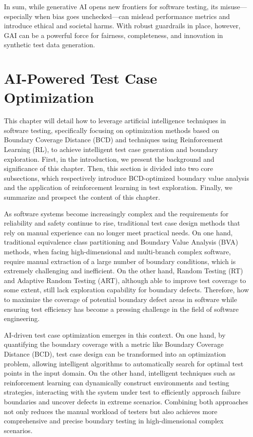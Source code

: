 \documentclass[manuscript,screen,review]{acmart}
\begin{document}
In sum, while generative AI opens new frontiers for software testing, its misuse---especially when bias goes unchecked---can mislead performance metrics and introduce ethical and societal harms. With robust guardrails in place, however, GAI can be a powerful force for fairness, completeness, and innovation in synthetic test data generation.




\section{AI-Powered Test Case Optimization}
\label{sec:3}

This chapter will detail how to leverage artificial intelligence techniques in software testing, specifically focusing on optimization methods based on Boundary Coverage Distance (BCD) and techniques using Reinforcement Learning (RL), to achieve intelligent test case generation and boundary exploration. First, in the introduction, we present the background and significance of this chapter. Then, this section is divided into two core subsections, which respectively introduce BCD-optimized boundary value analysis and the application of reinforcement learning in test exploration. Finally, we summarize and prospect the content of this chapter.

As software systems become increasingly complex and the requirements for reliability and safety continue to rise, traditional test case design methods that rely on manual experience can no longer meet practical needs. On one hand, traditional equivalence class partitioning and Boundary Value Analysis (BVA) methods, when facing high-dimensional and multi-branch complex software, require manual extraction of a large number of boundary conditions, which is extremely challenging and inefficient. On the other hand, Random Testing (RT) and Adaptive Random Testing (ART), although able to improve test coverage to some extent, still lack exploration capability for boundary defects. Therefore, how to maximize the coverage of potential boundary defect areas in software while ensuring test efficiency has become a pressing challenge in the field of software engineering.

AI-driven test case optimization emerges in this context. On one hand, by quantifying the boundary coverage with a metric like Boundary Coverage Distance (BCD), test case design can be transformed into an optimization problem, allowing intelligent algorithms to automatically search for optimal test points in the input domain. On the other hand, intelligent techniques such as reinforcement learning can dynamically construct environments and testing strategies, interacting with the system under test to efficiently approach failure boundaries and uncover defects in extreme scenarios. Combining both approaches not only reduces the manual workload of testers but also achieves more comprehensive and precise boundary testing in high-dimensional complex scenarios.
\end{document}
